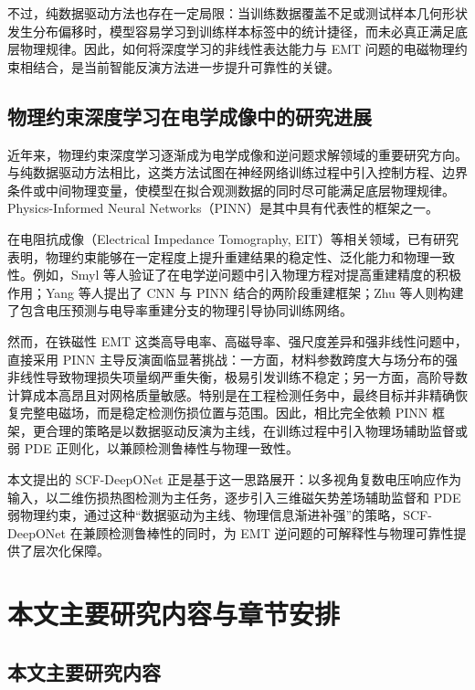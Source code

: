 不过，纯数据驱动方法也存在一定局限：当训练数据覆盖不足或测试样本几何形状发生分布偏移时，模型容易学习到训练样本标签中的统计捷径，而未必真正满足底层物理规律。因此，如何将深度学习的非线性表达能力与 EMT 问题的电磁物理约束相结合，是当前智能反演方法进一步提升可靠性的关键\citep{geirhos2020shortcut}。
 
\subsection{物理约束深度学习在电学成像中的研究进展}
 
近年来，物理约束深度学习逐渐成为电学成像和逆问题求解领域的重要研究方向。与纯数据驱动方法相比，这类方法试图在神经网络训练过程中引入控制方程、边界条件或中间物理变量，使模型在拟合观测数据的同时尽可能满足底层物理规律。Physics-Informed Neural Networks（PINN）是其中具有代表性的框架之一。
 
在电阻抗成像（Electrical Impedance Tomography, EIT）等相关领域，已有研究表明，物理约束能够在一定程度上提升重建结果的稳定性、泛化能力和物理一致性。例如，Smyl 等人验证了在电学逆问题中引入物理方程对提高重建精度的积极作用；Yang 等人提出了 CNN 与 PINN 结合的两阶段重建框架；Zhu 等人则构建了包含电压预测与电导率重建分支的物理引导协同训练网络。
 
然而，在铁磁性 EMT 这类高导电率、高磁导率、强尺度差异和强非线性问题中，直接采用 PINN 主导反演面临显著挑战：一方面，材料参数跨度大与场分布的强非线性导致物理损失项量纲严重失衡，极易引发训练不稳定；另一方面，高阶导数计算成本高昂且对网格质量敏感。特别是在工程检测任务中，最终目标并非精确恢复完整电磁场，而是稳定检测伤损位置与范围。因此，相比完全依赖 PINN 框架，更合理的策略是以数据驱动反演为主线，在训练过程中引入物理场辅助监督或弱 PDE 正则化，以兼顾检测鲁棒性与物理一致性\citep{wang2021physicsinformed}。
 
本文提出的 SCF-DeepONet 正是基于这一思路展开：以多视角复数电压响应作为输入，以二维伤损热图检测为主任务，逐步引入三维磁矢势差场辅助监督和 PDE 弱物理约束，通过这种``数据驱动为主线、物理信息渐进补强''的策略，SCF-DeepONet 在兼顾检测鲁棒性的同时，为 EMT 逆问题的可解释性与物理可靠性提供了层次化保障。

\section{本文主要研究内容与章节安排}

\subsection{本文主要研究内容}

